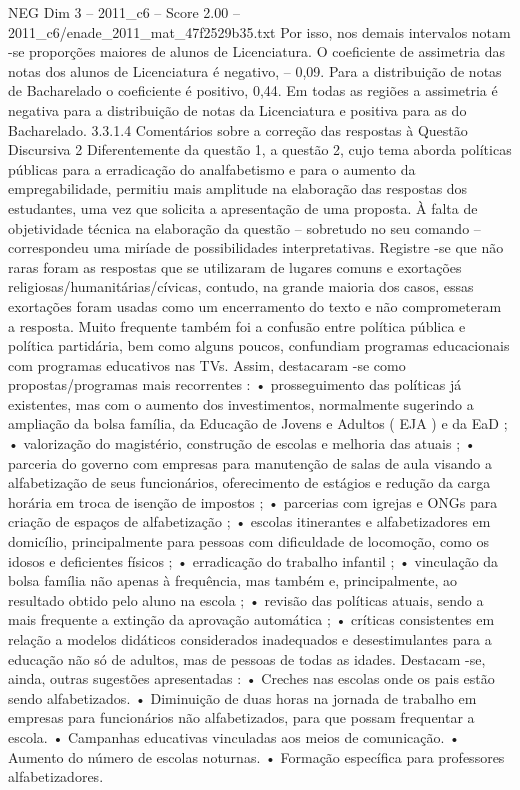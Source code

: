 \begin{textsample}{NEG Dim 3 – 2011\_c6 – Score 2.00 – 2011\_c6/enade\_2011\_mat\_47f2529b35.txt}
Por isso, nos demais intervalos notam -se proporções maiores de alunos de Licenciatura.
O coeficiente de assimetria das notas dos alunos de Licenciatura é negativo, – 0,09.
Para a distribuição de notas de Bacharelado o coeficiente é positivo, 0,44.
Em todas as regiões a assimetria é negativa para a distribuição de notas da Licenciatura e positiva para as do Bacharelado. 3.3.1.4 Comentários sobre a correção das respostas à Questão Discursiva 2 Diferentemente da questão 1, a questão 2, cujo tema aborda políticas públicas para a erradicação do analfabetismo e para o aumento da empregabilidade, permitiu mais amplitude na elaboração das respostas dos estudantes, uma vez que solicita a apresentação de uma proposta.
À falta de objetividade técnica na elaboração da questão – sobretudo no seu comando – correspondeu uma miríade de possibilidades interpretativas.
Registre -se que não raras foram as respostas que se utilizaram de lugares comuns e exortações religiosas/humanitárias/cívicas, contudo, na grande maioria dos casos, essas exortações foram usadas como um encerramento do texto e não comprometeram a resposta.
Muito frequente também foi a confusão entre política pública e política partidária, bem como alguns poucos, confundiam programas educacionais com programas educativos nas TVs.
Assim, destacaram -se como propostas/programas mais recorrentes : • prosseguimento das políticas já existentes, mas com o aumento dos investimentos, normalmente sugerindo a ampliação da bolsa família, da Educação de Jovens e Adultos ( EJA ) e da EaD ; • valorização do magistério, construção de escolas e melhoria das atuais ; • parceria do governo com empresas para manutenção de salas de aula visando a alfabetização de seus funcionários, oferecimento de estágios e redução da carga horária em troca de isenção de impostos ; • parcerias com igrejas e ONGs para criação de espaços de alfabetização ; • escolas itinerantes e alfabetizadores em domicílio, principalmente para pessoas com dificuldade de locomoção, como os idosos e deficientes físicos ; • erradicação do trabalho infantil ; • vinculação da bolsa família não apenas à frequência, mas também e, principalmente, ao resultado obtido pelo aluno na escola ; • revisão das políticas atuais, sendo a mais frequente a extinção da aprovação automática ; • críticas consistentes em relação a modelos didáticos considerados inadequados e desestimulantes para a educação não só de adultos, mas de pessoas de todas as idades.
Destacam -se, ainda, outras sugestões apresentadas : • Creches nas escolas onde os pais estão sendo alfabetizados. • Diminuição de duas horas na jornada de trabalho em empresas para funcionários não alfabetizados, para que possam frequentar a escola. • Campanhas educativas vinculadas aos meios de comunicação. • Aumento do número de escolas noturnas. • Formação específica para professores alfabetizadores.

\end{textsample}
